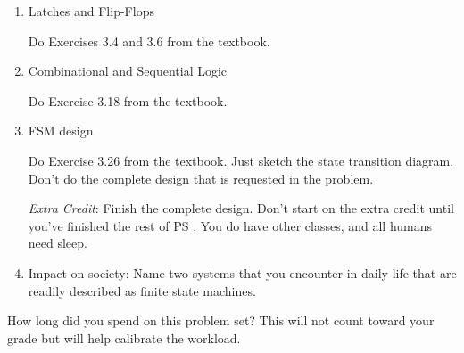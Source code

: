 \documentclass{ps}
\begin{document}
\begin{enumerate}
\begin{center}
  \end{center}
  \begin{solution}
  \end{solution}

\item Latches and Flip-Flops

  Do Exercises 3.4 and 3.6 from the textbook.
  \begin{solution}
  \end{solution}

\item Combinational and Sequential Logic

  Do Exercise 3.18 from the textbook.
  \begin{solution}
  \end{solution}

\item FSM design

  Do Exercise 3.26 from the textbook.  Just sketch the state
  transition diagram.  Don't do the complete design that is requested
  in the problem.

  \textit{Extra Credit}: Finish the complete design.  Don't start on
  the extra credit until you've finished the rest of PS \theps.  You
  do have other classes, and all humans need sleep.
  \begin{solution}
  \end{solution}

\item Impact on society: Name two systems that you encounter in daily
  life that are readily described as finite state machines.
  \begin{solution}
  \end{solution}
\end{enumerate}

How long did you spend on this problem set?  This will not count
toward your grade but will help calibrate the workload.
\begin{solution}
\end{solution}
\end{document}
